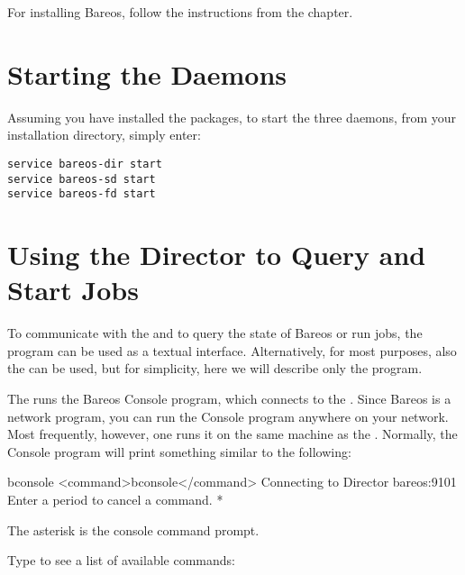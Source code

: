 For installing Bareos, follow the instructions from the  chapter.

\section{Starting the Daemons}
\label{StartDaemon}

Assuming you have installed the packages,
to start the three daemons, from your installation directory, simply enter:

\begin{verbatim}
service bareos-dir start
service bareos-sd start
service bareos-fd start
\end{verbatim}

\section{Using the Director to Query and Start Jobs}

\label{sec:TuturialBconsole}

To communicate with the \bareosDir and to query the state of Bareos or run jobs,
the  program can be used as a textual interface.
Alternatively, for most purposes, also the  can be used,
but for simplicity, here we will describe only the  program.

The  runs the Bareos Console program, which connects to the
\bareosDir. Since Bareos is a network program, you can run the Console
program anywhere on your network. Most frequently, however, one runs it on the
same machine as the \bareosDir. Normally, the Console program will print
something similar to the following:

\begin{commands}{bconsole}
<command>bconsole</command>
Connecting to Director bareos:9101
Enter a period to cancel a command.
*
\end{commands}

The asterisk is the console command prompt.

Type  to see a list of available commands:

